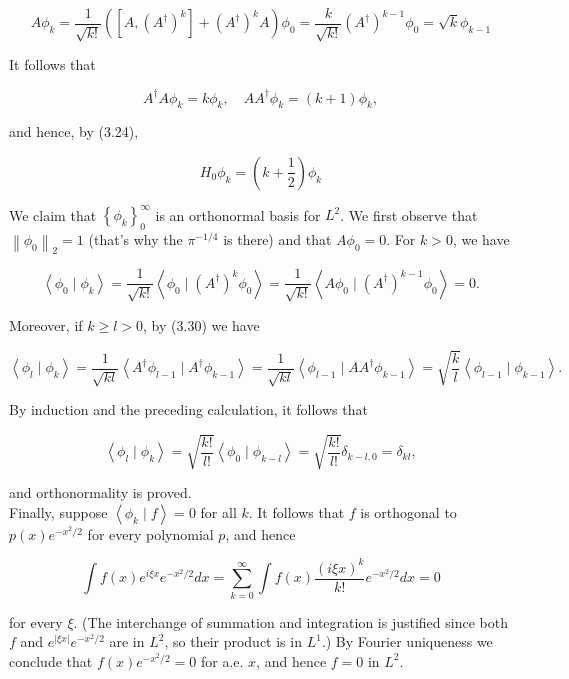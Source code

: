 \documentclass[10pt, letterpaper]{article}
\begin{document}
$$
A \phi_{k}=\frac{1}{\sqrt{k!}}\left(\left[A,\left(A^{\dagger}\right)^{k}\right]+\left(A^{\dagger}\right)^{k} A\right) \phi_{0}=\frac{k}{\sqrt{k!}}\left(A^{\dagger}\right)^{k-1} \phi_{0}=\sqrt{k} \phi_{k-1}
$$

It follows that

$$
A^{\dagger} A \phi_{k}=k \phi_{k}, \quad A A^{\dagger} \phi_{k}=(k+1) \phi_{k},
$$

and hence, by (3.24),

$$
H_{0} \phi_{k}=\left(k+\frac{1}{2}\right) \phi_{k}
$$

We claim that $\left\{\phi_{k}\right\}_{0}^{\infty}$ is an orthonormal basis for $L^{2}$. We first observe that $\left\|\phi_{0}\right\|_{2}=1$ (that's why the $\pi^{-1 / 4}$ is there) and that $A \phi_{0}=0$. For $k>0$, we have

$$
\left\langle\phi_{0} \mid \phi_{k}\right\rangle=\frac{1}{\sqrt{k!}}\left\langle\phi_{0} \mid\left(A^{\dagger}\right)^{k} \phi_{0}\right\rangle=\frac{1}{\sqrt{k!}}\left\langle A \phi_{0} \mid\left(A^{\dagger}\right)^{k-1} \phi_{0}\right\rangle=0 .
$$

Moreover, if $k \geq l>0$, by (3.30) we have

$$
\left\langle\phi_{l} \mid \phi_{k}\right\rangle=\frac{1}{\sqrt{k l}}\left\langle A^{\dagger} \phi_{l-1} \mid A^{\dagger} \phi_{k-1}\right\rangle=\frac{1}{\sqrt{k l}}\left\langle\phi_{l-1} \mid A A^{\dagger} \phi_{k-1}\right\rangle=\sqrt{\frac{k}{l}}\left\langle\phi_{l-1} \mid \phi_{k-1}\right\rangle .
$$

By induction and the preceding calculation, it follows that

$$
\left\langle\phi_{l} \mid \phi_{k}\right\rangle=\sqrt{\frac{k!}{l!}}\left\langle\phi_{0} \mid \phi_{k-l}\right\rangle=\sqrt{\frac{k!}{l!}} \delta_{k-l, 0}=\delta_{k l},
$$

and orthonormality is proved.\\
Finally, suppose $\left\langle\phi_{k} \mid f\right\rangle=0$ for all $k$. It follows that $f$ is orthogonal to $p(x) e^{-x^{2} / 2}$ for every polynomial $p$, and hence

$$
\int f(x) e^{i \xi x} e^{-x^{2} / 2} d x=\sum_{k=0}^{\infty} \int f(x) \frac{(i \xi x)^{k}}{k!} e^{-x^{2} / 2} d x=0
$$

for every $\xi$. (The interchange of summation and integration is justified since both $f$ and $e^{|\xi x|} e^{-x^{2} / 2}$ are in $L^{2}$, so their product is in $L^{1}$.) By Fourier uniqueness we conclude that $f(x) e^{-x^{2} / 2}=0$ for a.e. $x$, and hence $f=0$ in $L^{2}$.
\end{document}
